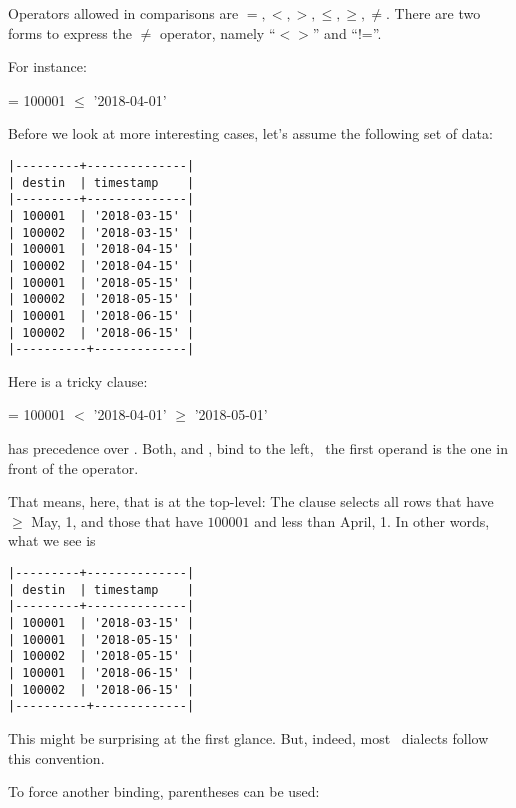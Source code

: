 Operators allowed in comparisons are
$=, <, >, \le, \ge, \ne$.
There are two forms to express the $\ne$
operator, namely ``$<>$'' and ``!=''. 

For instance:

  = 100001
  $\le$ '2018-04-01'

Before we look at more interesting cases,
let's assume the following set of data:

\begin{minipage}{\textwidth}
\begin{verbatim}
|---------+--------------|
| destin  | timestamp    |
|---------+--------------|
| 100001  | '2018-03-15' |
| 100002  | '2018-03-15' |
| 100001  | '2018-04-15' |
| 100002  | '2018-04-15' |
| 100001  | '2018-05-15' |
| 100002  | '2018-05-15' |
| 100001  | '2018-06-15' |
| 100002  | '2018-06-15' |
|----------+-------------|
\end{verbatim}
\end{minipage}

Here is a tricky  clause:

  = 100001
  $<$ '2018-04-01'
  $\ge$ '2018-05-01'

 has precedence over .
Both,  and , bind to the left,
\ie\ the first operand is the one in front of the operator.

That means, here, that  is at the top-level:
The clause selects all rows that have 
$\ge$ May, 1, and those that have  $100001$
and  less than April, 1.
In other words, what we see is

\begin{minipage}{\textwidth}
\begin{verbatim}
|---------+--------------|
| destin  | timestamp    |
|---------+--------------|
| 100001  | '2018-03-15' |
| 100001  | '2018-05-15' |
| 100002  | '2018-05-15' |
| 100001  | '2018-06-15' |
| 100002  | '2018-06-15' |
|----------+-------------|
\end{verbatim}
\end{minipage}

This might be surprising at the first glance.
But, indeed, most \sql\ dialects follow this convention.

To force another binding, parentheses can be used:

